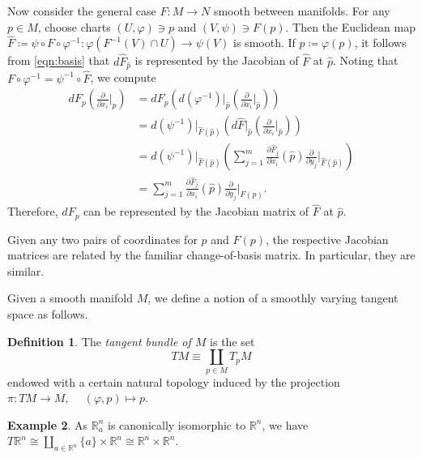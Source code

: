 \documentclass[10pt,letterpaper,cm]{nupset}
\theoremstyle{definition}
\newtheorem{definition}{Definition}[subsection]
\newtheorem{exmp}[definition]{Example}
\theoremstyle{theorem}
\theoremstyle{remark}
\newcommand{\R}{\mathbb R}
\newcommand{\1}{\mathbf{1}}
\newcommand{\0}{\vec 0}
\begin{document}
Now consider the general case $F: M \to N$ smooth between manifolds. For any $p \in M$, choose charts $\left(U, \varphi\right) \ni p$ and $\left(V, \psi\right) \ni F(p)$. Then the Euclidean map $\widehat{F}\coloneqq  \psi \circ F \circ \varphi^{-1} : \varphi(F^{-1}(V) \cap U) \to \psi(V)$ is smooth. If $\hat{p}\coloneqq  \varphi(p)$, it follows from \eqref{eqn:basis} that $d\widehat{F}_{\hat{p}}$ is represented by the Jacobian of $\widehat{F}$ at $\hat{p}$. Noting that $F \circ \varphi^{-1} = \psi^{-1} \circ \widehat{F}$, we compute
\begin{align*}
dF_p\left(\frac{\partial}{\partial{x_i}}\bigr\rvert_p\right) 
 & =  dF_p\left(d(\varphi^{-1})\bigr\rvert_{\hat{p}}\left(\frac{\partial}{\partial{x_i}}\bigr\rvert_{\hat{p}}\right)\right) 
\\ & = d(\psi^{-1})\bigr\rvert_{\widehat{F}(\hat{p})}\left(d\widehat{F}\bigr\rvert_{\hat{p}}\left(\frac{\partial}{\partial{x_i}}\bigr\rvert_{\hat{p}}\right)\right)
\\ & = d(\psi^{-1})\bigr\rvert_{\widehat{F}(\hat{p})}\left(\sum_{j=1}^m \frac{\partial{\widehat{F}_j}}{\partial{x_i}}(\hat{p})\frac{\partial}{\partial{y_j}}\bigr\rvert_{\widehat{F}(\hat{p})}\right) 
\\ & = 
\sum_{j=1}^m \frac{\partial{\widehat{F}_j}}{\partial{x_i}}(\hat{p})\frac{\partial}{\partial{y_j}}\bigr\rvert_{F(p)}.
\end{align*}
Therefore, $dF_p$ can be represented by the Jacobian matrix of $\widehat{F}$ at $\hat{p}$. 

\smallskip

Given any two pairs of coordinates for $p$ and $F(p)$, the respective Jacobian matrices are related by the familiar change-of-basis matrix. In particular, they are similar.

\bigskip

Given a smooth manifold $M$, we define a notion of a smoothly varying tangent space as follows. 

\begin{definition}
 The \textit{tangent bundle of $M$} is the set  $$TM \equiv \coprod_{p \in M} T_pM$$ endowed with a certain natural topology induced by the projection $\pi: TM \to M, \ \quad (\varphi, p) \mapsto p$.
 \end{definition}

\begin{exmp}
As $\R_a^n$ is canonically isomorphic to $\R^n$, we have $T\R^n \cong \coprod_{a\in \R^n} \{a\} \times \R^n \cong \R^n \times \R^n$.
\end{exmp}
\end{document}
